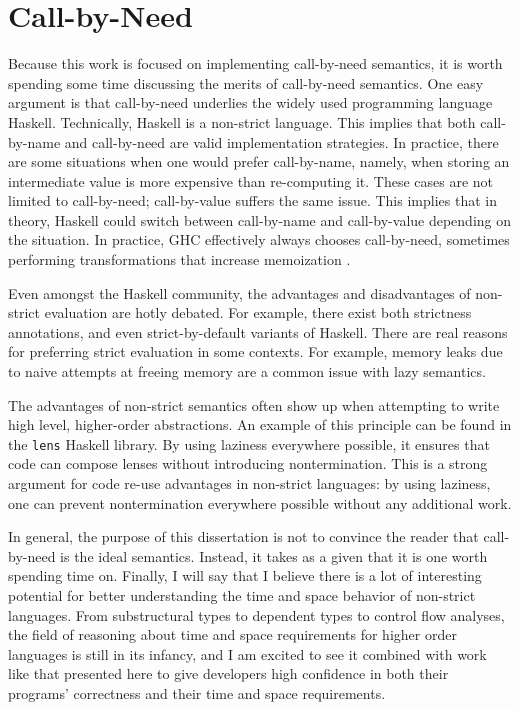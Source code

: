 \section{Call-by-Need}

Because this work is focused on implementing call-by-need semantics, it is worth
spending some time discussing the merits of call-by-need semantics. One easy
argument is that call-by-need underlies the widely used programming language
Haskell.  Technically, Haskell is a non-strict language. This implies that both
call-by-name and call-by-need are valid implementation strategies. In practice,
there are some situations when one would prefer call-by-name, namely, when
storing an intermediate value is more expensive than re-computing it. These
cases are not limited to call-by-need; call-by-value suffers the same issue.
This implies that in theory, Haskell could switch between call-by-name and
call-by-value depending on the situation. In practice, GHC effectively always
chooses call-by-need, sometimes performing transformations that increase
memoization \cite{jones96floating}.

Even amongst the Haskell community, the advantages and disadvantages of
non-strict evaluation are hotly debated. For example, there exist both
strictness annotations, and even strict-by-default variants of Haskell. There are
real reasons for preferring strict evaluation in some contexts. For example,
memory leaks due to naive attempts at freeing memory are a common issue with
lazy semantics. 

The advantages of non-strict semantics often show up when attempting to write
high level, higher-order abstractions. An example of this principle can be found
in the \texttt{lens} Haskell library. By using laziness everywhere possible, it
ensures that code can compose lenses without introducing nontermination. This is
a strong argument for code re-use advantages in non-strict languages: by using
laziness, one can prevent nontermination everywhere possible without any
additional work. 

In general, the purpose of this dissertation is not to convince the reader that
call-by-need is the ideal semantics. Instead, it takes as a given that it is one
worth spending time on. Finally, I will say that I believe there is a lot of
interesting potential for better understanding the time and space behavior of
non-strict languages. From substructural types to dependent types to control
flow analyses, the field of reasoning about time and space requirements for
higher order languages is still in its infancy, and I am excited to see it
combined with work like that presented here to give developers high confidence
in both their programs' correctness and their time and space requirements. 

